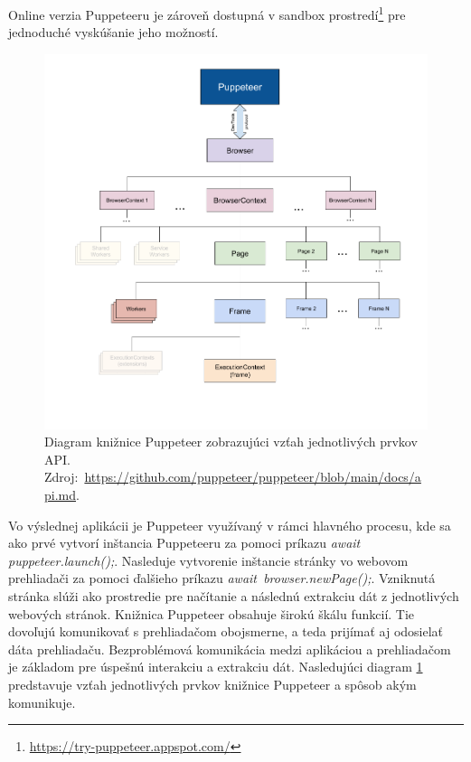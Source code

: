 Online verzia Puppeteeru je zároveň dostupná v sandbox prostredí\footnote{\url{https://try-puppeteer.appspot.com/}} pre jednoduché vyskúšanie jeho možností.

\bigskip

\begin{figure}[hbt]
	\centering
	\includegraphics[width=1\textwidth]{obrazky-figures/diagram.png}
	\caption{Diagram knižnice Puppeteer zobrazujúci vzťah jednotlivých prvkov API.\\ \mbox{Zdroj: \url{https://github.com/puppeteer/puppeteer/blob/main/docs/api.md}}.}
	\label{diagram}
\end{figure}

Vo výslednej aplikácii je Puppeteer využívaný v rámci hlavného procesu, kde sa ako prvé vytvorí inštancia Puppeteeru za pomoci príkazu \textit{await puppeteer.launch();}. Nasleduje vytvorenie inštancie stránky vo webovom prehliadači za pomoci ďalšieho príkazu \mbox{\textit{await browser.newPage();}}. Vzniknutá stránka slúži ako prostredie pre načítanie a následnú extrakciu dát z jednotlivých webových stránok. Knižnica Puppeteer obsahuje širokú škálu funkcií. Tie dovoľujú komunikovať s prehliadačom obojsmerne, a teda prijímať aj odosielať dáta prehliadaču. Bezproblémová komunikácia medzi aplikáciou a prehliadačom je základom pre úspešnú interakciu a extrakciu dát. Nasledujúci diagram \ref{diagram} predstavuje vzťah jednotlivých prvkov knižnice Puppeteer a spôsob akým komunikuje.

